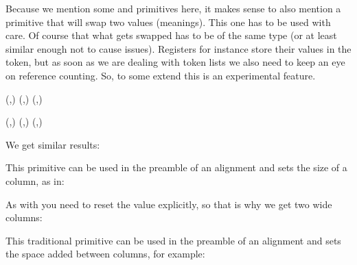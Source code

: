\stopnewprimitive

\startnewprimitive[title={\prm {swapcsvalues}}]

Because we mention some  and  primitives here, it makes
sense to also mention a primitive that will swap two values (meanings). This one
has to be used with care. Of course that what gets swapped has to be of the same
type (or at least similar enough not to cause issues). Registers for instance
store their values in the token, but as soon as we are dealing with token lists
we also need to keep an eye on reference counting. So, to some extend this is
an experimental feature.

\startbuffer
{} 
(\the\scratchcounterone,\the\scratchcountertwo)
\swapcsvalues \scratchcounterone \scratchcountertwo
(\the\scratchcounterone,\the\scratchcountertwo)
\swapcsvalues \scratchcounterone \scratchcountertwo
(\the\scratchcounterone,\the\scratchcountertwo)

 
(\the\scratchcounterone,\the\scratchcountertwo)
\bgroup
\swapcsvalues \scratchcounterone \scratchcountertwo
(\the\scratchcounterone,\the\scratchcountertwo)
\egroup
(\the\scratchcounterone,\the\scratchcountertwo)
\stopbuffer

\typebuffer

We get similar results:

\startlines
\getbuffer
\stoplines

\stopnewprimitive

\startnewprimitive[title={\prm {tabsize}}]

This primitive can be used in the preamble of an alignment and sets the size of
a column, as in:

\startbuffer
\halign{%
    \aligncontent             \aligntab
    \aligncontent\tabsize 3cm \aligntab
    \aligncontent             \aligntab
    \aligncontent\tabsize 0cm \cr
    1  \aligntab 111\aligntab 1111\aligntab 11\cr
    222\aligntab 2  \aligntab 2222\aligntab 22\cr
}
\stopbuffer

\typebuffer

As with  you need to reset the value explicitly, so that is why we
get two wide columns:

\blank {\showboxes \getbuffer} \blank

\stopnewprimitive

\startoldprimitive[title={\prm {tabskip}}]

This traditional primitive can be used in the preamble of an alignment and sets the
space added between columns, for example:

